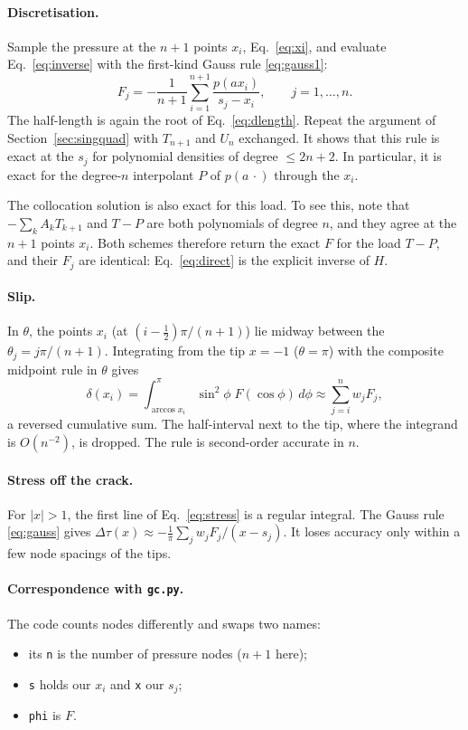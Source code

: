 \documentclass[12pt]{article}
\begin{document}
\paragraph{Discretisation.} Sample the pressure at the $n+1$ points $x_i$,
Eq.~\eqref{eq:xi}, and evaluate Eq.~\eqref{eq:inverse} with the first-kind Gauss
rule \eqref{eq:gauss1}:
\begin{equation}\label{eq:direct}
	F_j = -\frac{1}{n+1}\sum_{i=1}^{n+1}\frac{p(ax_i)}{s_j-x_i},
	\qquad j=1,\dots,n .
\end{equation}
The half-length is again the root of Eq.~\eqref{eq:dlength}. Repeat the argument
of Section~\ref{sec:singquad} with $T_{n+1}$ and $U_n$ exchanged. It shows that this rule is exact
at the $s_j$ for polynomial densities of degree $\le 2n+2$. In particular, it is
exact for the degree-$n$ interpolant $P$ of $p(a\,\cdot)$ through the $x_i$.

The collocation solution is also exact for this load. To see this, note that
$-\sum_kA_kT_{k+1}$ and $T-P$ are both polynomials of degree $n$, and they agree
at the $n+1$ points $x_i$. Both schemes therefore return the exact $F$ for the
load $T-P$, and their $F_j$ are identical: Eq.~\eqref{eq:direct} is the
explicit inverse of $H$.

\paragraph{Slip.} In $\theta$, the points $x_i$ (at $(i-\frac12)\pi/(n+1)$) lie
midway between the $\theta_j = j\pi/(n+1)$. Integrating from the tip $x=-1$
($\theta=\pi$) with the composite midpoint rule in $\theta$ gives
\begin{equation}\label{eq:midpoint}
	\delta(x_i) = \int_{\arccos x_i}^{\pi}\sin^2\phi\;F(\cos\phi)\,d\phi
	\approx \sum_{j=i}^{n} w_jF_j ,
\end{equation}
a reversed cumulative sum. The half-interval next to the tip, where the integrand
is $O(n^{-2})$, is dropped. The rule is second-order accurate in $n$.

\paragraph{Stress off the crack.} For $|x|>1$, the first line of
Eq.~\eqref{eq:stress} is a regular integral. The Gauss rule \eqref{eq:gauss}
gives $\Delta\tau(x) \approx -\frac1\pi\sum_jw_jF_j/(x-s_j)$. It loses accuracy
only within a few node spacings of the tips.

\paragraph{Correspondence with \texttt{gc.py}.} The code counts nodes differently
and swaps two names:
\begin{itemize}
	\item its \texttt{n} is the number of pressure nodes ($n+1$ here);
	\item \texttt{s} holds our $x_i$ and \texttt{x} our $s_j$;
	\item \texttt{phi} is $F$.
\end{itemize}
\end{document}
